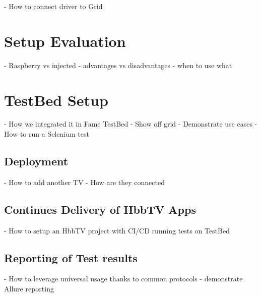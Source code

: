 - How to connect driver to Grid

\section{Setup Evaluation\label{sec:setupevaluation}}

- Raspberry vs injected
- advantages vs disadvantages
- when to use what

\section{TestBed Setup\label{sec:testbed}}

- How we integrated it in Fame TestBed
- Show off grid
- Demonstrate use cases
- How to run a Selenium test

\subsection{Deployment\label{sec:deployment}}

- How to add another TV
- How are they connected

\subsection{Continues Delivery of HbbTV Apps\label{sec:cicdhbbtvapps}}

- How to setup an HbbTV project with CI/CD running tests on TestBed

\subsection{Reporting of Test results\label{sec:reporting}}

- How to leverage universal usage thanks to common protocols
- demonstrate Allure reporting

